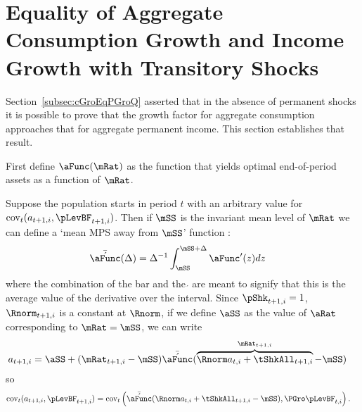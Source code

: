 \documentclass[\econtexRoot/BufferStockTheory]{subfiles}
\begin{document}
\section{Equality of Aggregate Consumption Growth and Income Growth with Transitory Shocks}\label{sec:ApndxCGroIsPGro}

Section~\ref{subsec:cGroEqPGroQ} asserted that in the absence of permanent shocks it is possible to prove
that the growth factor for aggregate consumption approaches that for aggregate permanent
income.  This section establishes that result.

First define $\aFunc(\mRat)$ as the function that yields optimal end-of-period assets as a function of $\mRat$.

Suppose the population starts in period $t$ with an arbitrary value for
 $\mbox{cov}_{t}(a_{t+1,i},\pLevBF_{t+1,i})$. 
 Then if $\mSS$ is the invariant mean level of $\mRat$ we can define a `mean MPS away from $\mSS$' function
 \newcommand{\AMPS}{\bar{\acute{\aFunc}}}:
\begin{equation}\begin{gathered}\begin{aligned}
 \AMPS(\Delta)  & =  \Delta^{-1}\int_{\mSS}^{\mSS+\Delta} \aFunc^{\prime}(z)
 dz \label{eq:checkaFunc} \nonumber
\end{aligned}\end{gathered}\end{equation}
where the combination of the bar and the $\acute{}$ are meant to signify that this is the average value of the derivative over the interval.
Since $\pShk_{t+1,i}=1$, $\Rnorm_{t+1,i}$ is a constant at $\Rnorm$, if we define $\aSS$ as the value of $\aRat$ corresponding to $\mRat = \mSS$, we can write
\begin{equation}\begin{gathered}\begin{aligned}
  a_{t+1,i} 
& =   \aSS+(\mRat_{t+1,i}-\mSS)\AMPS(\overbrace{\Rnorm
    a_{t,i}+\tShkAll_{t+1,i}}^{\mRat_{t+1,i}}-\mSS) \nonumber
\end{aligned}\end{gathered}\end{equation}
so
\begin{equation}\begin{gathered}\begin{aligned}
\mbox{cov}_{t}(a_{t+1,i},\pLevBF_{t+1,i})
 & = \mbox{cov}_{t}\left(\AMPS(\Rnorm  a_{t,i}+\tShkAll_{t+1,i}-\mSS)
  ,\PGro   \pLevBF_{t,i}\right). \nonumber
\end{aligned}\end{gathered}\end{equation}
\end{document}
